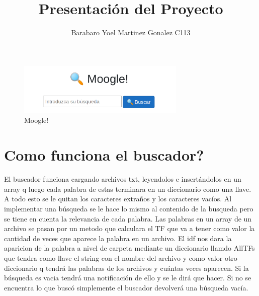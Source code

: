 \documentclass[a4paper,12pt]{article}
\begin{document}
\title{Presentación del Proyecto}
\author{Barabaro Yoel Martinez Gonalez C113}

\maketitle
\begin{figure}[h]
	\center
	\includegraphics[width=8cm]{moogle.png}
	\caption{Moogle!}
	\label{fig:logo}
\end{figure}
\section{Como funciona el buscador?}



\begin{flushleft}
El buscador funciona cargando archivos txt, leyendolos e insertándolos en un array q luego cada palabra de estas terminara en un diccionario como una llave. A todo esto se le quitan los caracteres extraños y los caracteres vacíos. Al implementar una búsqueda se le hace lo mismo al contenido de la busqueda pero se tiene en cuenta la relevancia de cada palabra. Las palabras en un array de un archivo se pasan por un metodo que calculara el TF que va a tener como valor la cantidad de veces que aparece la palabra en un archivo. El idf nos dara la aparicion de la palabra a nivel de carpeta mediante un diccionario llamdo AllTFs que tendra como llave el string con el nombre del archivo y como valor otro diccionario q tendrá las palabras de los archivos y cuántas veces aparecen. Si la búsqueda es vacia tendrá una notificación de ello y se le dirá que hacer. Si no se encuentra lo que buscó simplemente el buscador devolverá una búsqueda vacía.


\end{flushleft}
\end{document}
